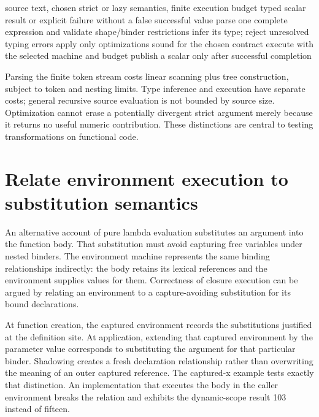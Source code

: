 \begin{algorithm}[htbp]
\caption{Run a functional program through explicit validation and execution boundaries.}
\label{alg:ch89-run}
\begin{pseudocode}
\Require source text, chosen strict or lazy semantics, finite execution budget
\Ensure typed scalar result or explicit failure without a false successful value
\State parse one complete expression and validate shape/binder restrictions
\State infer its type; reject unresolved typing errors
\State apply only optimizations sound for the chosen contract
\State execute with the selected machine and budget
\State publish a scalar only after successful completion
\end{pseudocode}
\end{algorithm}

Parsing the finite token stream costs linear scanning plus tree construction, subject to token and nesting limits.
Type inference and execution have separate costs; general recursive source evaluation is not bounded by source size.
Optimization cannot erase a potentially divergent strict argument merely because it returns no useful numeric contribution.
These distinctions are central to testing transformations on functional code.

\section{Relate environment execution to substitution semantics}
\label{sec:ch89-substitution}
An alternative account of pure lambda evaluation substitutes an argument into the function body.
That substitution must avoid capturing free variables under nested binders.
The environment machine represents the same binding relationships indirectly: the body retains its lexical references and the environment supplies values for them.
Correctness of closure execution can be argued by relating an environment to a capture-avoiding substitution for its bound declarations.

At function creation, the captured environment records the substitutions justified at the definition site.
At application, extending that captured environment by the parameter value corresponds to substituting the argument for that particular binder.
Shadowing creates a fresh declaration relationship rather than overwriting the meaning of an outer captured reference.
The captured-x example tests exactly that distinction.
An implementation that executes the body in the caller environment breaks the relation and exhibits the dynamic-scope result 103 instead of fifteen.

